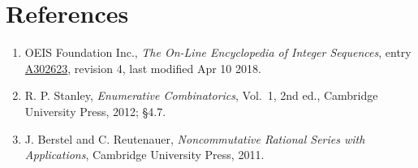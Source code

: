 \documentclass[11pt]{article}
\theoremstyle{definition}
\begin{document}
\section{References}

\begin{enumerate}

\item OEIS Foundation Inc., \emph{The On-Line Encyclopedia of Integer Sequences}, entry \href{https://oeis.org/A302623}{A302623}, revision 4, last modified Apr 10 2018.

\item R. P. Stanley, \emph{Enumerative Combinatorics}, Vol.~1, 2nd ed., Cambridge University Press, 2012; \S4.7.

\item J. Berstel and C. Reutenauer, \emph{Noncommutative Rational Series with Applications}, Cambridge University Press, 2011.

\end{enumerate}
\end{document}
